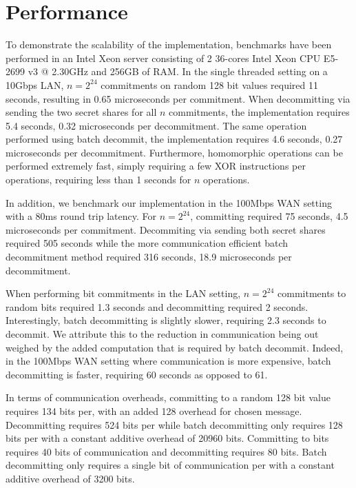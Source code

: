 
\section{Performance}
To demonstrate the scalability of the implementation, benchmarks have been performed in an Intel Xeon server consisting of 2 36-cores Intel Xeon CPU E5-2699 v3 @ 2.30GHz and 256GB of RAM. In the single threaded setting on a 10Gbps LAN, $n=2^{24}$ commitments on random 128 bit values required 11 seconds, resulting in 0.65 microseconds per commitment. When decommitting via sending the two secret shares for all $n$ commitments, the implementation requires 5.4 seconds, 0.32 microseconds per decommitment. The same operation performed using batch decommit, the implementation requires 4.6 seconds, 0.27 microseconds per decommitment. Furthermore, homomorphic operations can be performed extremely fast, simply requiring  a few XOR instructions per operations, requiring less than 1 seconds for $n$ operations. 

In addition, we benchmark our implementation in the 100Mbps WAN setting with a 80ms round trip latency. For $n=2^{24}$, committing  required 75 seconds, 4.5 microseconds per commitment. Decommiting via sending both secret shares required 505 seconds while the more communication efficient batch decommitment method required 316 seconds, 18.9 microseconds per decommitment.



When performing bit commitments in the LAN setting, $n=2^{24}$ commitments to random bits required 1.3 seconds and decommitting required 2 seconds. Interestingly, batch decommitting is slightly slower, requiring 2.3 seconds to decommit. We attribute this to the reduction in communication being out weighed by the added computation that is required by batch decommit. Indeed, in the 100Mbps WAN setting where communication is more expensive, batch decommitting is faster, requiring 60 seconds as opposed to 61.

In terms of communication overheads, committing to a random 128 bit value requires 134 bits per, with an added 128 overhead for chosen message. Decommitting requires 524 bits per while batch decommitting only requires 128 bits per with a constant additive overhead of 20960 bits. Committing to bits requires 40 bits of communication and decommitting requires 80 bits. Batch decommitting only requires a single bit of communication per with a constant additive overhead of 3200 bits.